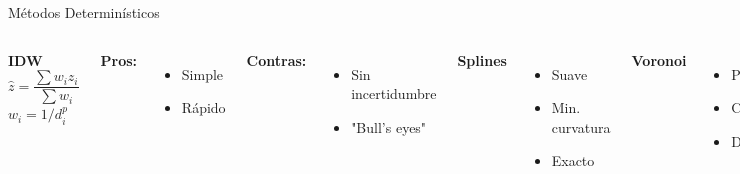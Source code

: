 \documentclass[10pt,aspectratio=169]{beamer}
\begin{document}
\begin{frame}{Métodos Determinísticos}
    \begin{columns}[T]
        \textbf{IDW}
        $$\hat{z} = \frac{\sum w_i z_i}{\sum w_i}$$
        $w_i = 1/d_i^p$
        
        \textbf{Pros:}
        \begin{itemize}
            \item Simple
            \item Rápido
        \end{itemize}
        
        \textbf{Contras:}
        \begin{itemize}
            \item Sin incertidumbre
            \item "Bull's eyes"
        \end{itemize}
        
        \textbf{Splines}
        \begin{itemize}
            \item Suave
            \item Min. curvatura
            \item Exacto
        \end{itemize}
        
        \textbf{Voronoi}
        \begin{itemize}
            \item Polígonos
            \item Constante
            \item Discontinuo
        \end{itemize}
        
        \textbf{Trend}
        \begin{itemize}
            \item Polinomio
            \item Tendencia
            \item Inexacto
        \end{itemize}
        
\end{columns}
\end{frame}
\end{document}
